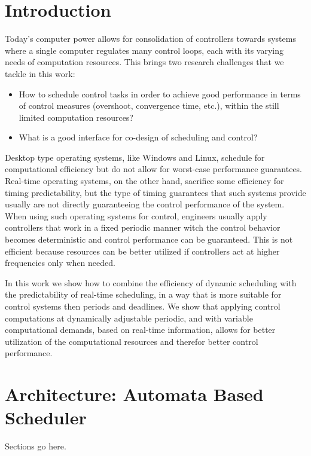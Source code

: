 \documentclass{sig-alternate-ipsn13}
\begin{document}
\section{Introduction}

Today's computer power allows for consolidation of controllers towards systems where a single computer regulates many control loops, each with its varying needs of computation resources.
This brings two research challenges that we tackle in this work: 
\begin{itemize}
	\item How to schedule control tasks in order to achieve good performance in terms of control measures (overshoot, convergence time, etc.), within the still limited computation resources?
	\item What is a good interface for co-design of scheduling and control?
\end{itemize}

Desktop type operating systems, like Windows and Linux, schedule for computational efficiency but do not allow for worst-case performance guarantees. Real-time operating systems, on the other hand, sacrifice some efficiency for timing predictability, but the type of timing guarantees that such systems provide usually are not directly guaranteeing the control performance of the system. 
When using such operating systems for control, engineers usually apply controllers that work in a fixed periodic manner witch the control behavior becomes deterministic and control performance can be guaranteed. This is not efficient because resources can be better utilized if controllers act at higher frequencies only when needed.

In this work we show how to combine the efficiency of dynamic scheduling with the predictability of real-time scheduling, in a way that is more suitable for control systems then periods and deadlines.
We show that applying control computations at dynamically adjustable periodic, and with variable computational demands, based on real-time information, allows for better utilization of the computational resources and therefor better control performance.

\section{Architecture: Automata Based Scheduler}

Sections go here.
\end{document}
